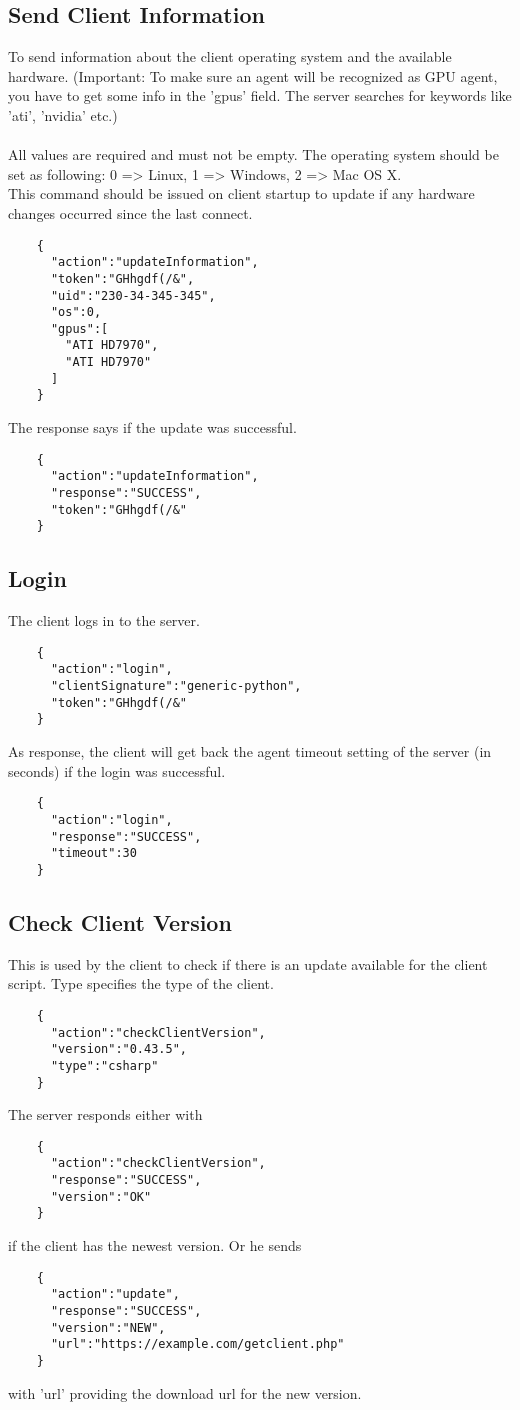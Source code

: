\documentclass{article}
\begin{document}
	\subsection*{Send Client Information}
	To send information about the client operating system and the available hardware. (Important: To make sure an agent will be recognized as GPU agent, you have to get some info in the 'gpus' field. The server searches for keywords like 'ati', 'nvidia' etc.)\\ \\
	All values are required and must not be empty. The operating system should be set as following: 0 => Linux, 1 => Windows, 2 => Mac OS X.\\
	This command should be issued on client startup to update if any hardware changes occurred since the last connect.
	\begin{verbatim}
	{
	  "action":"updateInformation",
	  "token":"GHhgdf(/&",
	  "uid":"230-34-345-345",
	  "os":0,
	  "gpus":[
	    "ATI HD7970",
	    "ATI HD7970"
	  ]
	}
	\end{verbatim}
	
	\noindent The response says if the update was successful.
	\begin{verbatim}
	{
	  "action":"updateInformation",
	  "response":"SUCCESS",
	  "token":"GHhgdf(/&"
	} 
	\end{verbatim}
	
	\subsection*{Login}
	The client logs in to the server.
	\begin{verbatim}
	{
	  "action":"login",
	  "clientSignature":"generic-python",
	  "token":"GHhgdf(/&"
	}
	\end{verbatim}
	As response, the client will get back the agent timeout setting of the server (in seconds) if the login
	was successful.
	\begin{verbatim}
	{
	  "action":"login",
	  "response":"SUCCESS",
	  "timeout":30
	}
	\end{verbatim}
	
	\subsection*{Check Client Version}
	This is used by the client to check if there is an update available for the client script. Type specifies the type of the client.
	\begin{verbatim}
	{
	  "action":"checkClientVersion",
	  "version":"0.43.5",
	  "type":"csharp"
	}
	\end{verbatim}
	The server responds either with
	\begin{verbatim}
	{
	  "action":"checkClientVersion",
	  "response":"SUCCESS",
	  "version":"OK"
	}
	\end{verbatim}
	if the client has the newest version. Or he sends
	\begin{verbatim}
	{
	  "action":"update",
	  "response":"SUCCESS",
	  "version":"NEW",
	  "url":"https://example.com/getclient.php"
	}
	\end{verbatim}
	with 'url' providing the download url for the new version.
	
\end{document}
